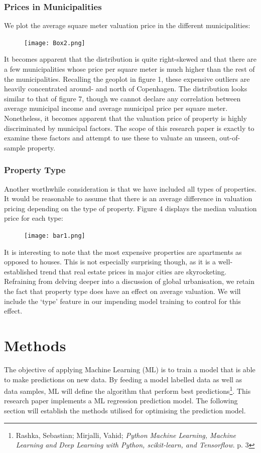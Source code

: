 \documentclass[12pt,a4paper]{article}
\begin{document}
\subsubsection{Prices in Municipalities}
We plot the average square meter valuation price in the different municipalities:
\begin{figure}[H]
  \centering
   \caption{}
   \texttt{[image: Box2.png]} 
  \label{fig:}
\end{figure}
It becomes apparent that the distribution is quite right-skewed and that there are a few municipalities whose price per square meter is much higher than the rest of the municipalities. Recalling the geoplot in figure 1, these expensive outliers are heavily concentrated around- and north of Copenhagen. 
The distribution looks similar to that of figure 7, though we cannot declare any correlation between average municipal income and average municipal price per square meter. Nonetheless, it becomes apparent that the valuation price of property is highly discriminated by municipal factors. The scope of this research paper is exactly to examine these factors and attempt to use these to valuate an unseen, out-of-sample property. 

\subsubsection{Property Type}
Another worthwhile consideration is that we have included all types of properties. It would be reasonable to assume that there is an average difference in valuation pricing depending on the type of property. Figure 4 displays the median valuation price for each type:
\begin{figure}[H]
  \centering
   \caption{}
   \texttt{[image: bar1.png]} 
  \label{fig:}
\end{figure}
It is interesting to note that the most expensive properties are apartments as opposed to houses. This is not especially surprising though, as it is a well-established trend that real estate prices in major cities are skyrocketing. Refraining from delving deeper into a discussion of global urbanisation, we retain the fact that property type does have an effect on average valuation. We will include the ‘type’ feature in our impending model training to control for this effect. 


\section{Methods}
The objective of applying Machine Learning (ML) is to train a model that is able to make predictions on new data. By feeding a model labelled data as well as data samples, ML will define the algorithm that perform best predictions\footnote{Rashka, Sebastian; Mirjalli, Vahid; \textit{Python Machine Learning, Machine Learning and Deep Learning with Python, scikit-learn, and Tensorflow}. p. 3}. This research paper implements a ML regression prediction model. The following section will establish the methods utilised for optimising the prediction model. 
\end{document}
